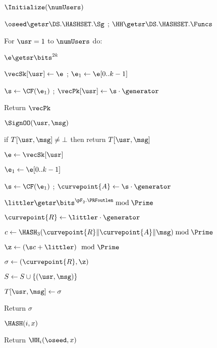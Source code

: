 \begin{figure}
	{
		
		\begin{oracle}{$\Initialize(\numUsers)$}
			\item $\oseed\getsr\DS.\HASHSET.\Sg$ ; 
			$\HH \getsr \DS.\HASHSET.\Funcs$
			\item For $\usr=1$ to $\numUsers$ do:
			\item \quad $\e\getsr \bits^{2k}$
			\item \quad $\vecSk[\usr] \gets \e$
			; $\e_1 \gets \e[0..k-1]$ 
			\item \quad $\s \gets \CF(\e_1)$ ; $\vecPk[\usr] \gets \s\cdot \generator$
			\item Return $\vecPk$
		\end{oracle}
		\ExptSepSpace
		
		\begin{oracle}{$\SignOO(\usr, \msg)$}
			\item if $T[\usr, \msg] \neq \bot$ then return $T[\usr, \msg]$
			\item $\e\gets \vecSk[\usr]$ 
			\item $\e_1 \gets \e[0..k-1]$
			\item $\s \gets \CF(\e_1)$ ; $\curvepoint{A} \gets \s\cdot \generator$
			\item $\littler \getsr \bits^{\pF_2.\PRFoutlen} \bmod \Prime$
			\item {}
			\item \quad \fbox{ $\littler \getsr \Z_\Prime$}
			\item $\curvepoint{R} \gets \littler\cdot \generator$
			\item $c \gets \HASH_3(\curvepoint{R}\|\curvepoint{A}\|\msg) \bmod \Prime$
			\item $\z \gets (\s c + \littler) \mod \Prime$
			\item $\sigma \gets (\curvepoint{R},\z)$
			\item $S \gets S \cup \{(\usr, \msg)\}$
			\item $T[\usr, \msg] \gets \sigma$
			\item Return $\sigma$
		\end{oracle}
		\ExptSepSpace
		
		\begin{oracle}{$\HASH(i,x)$}
			\item Return $\HH_i(\oseed,x)$
		\end{oracle}
		\ExptSepSpace
		
}
\end{figure}
